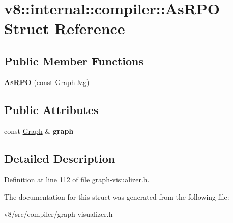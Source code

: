 \hypertarget{structv8_1_1internal_1_1compiler_1_1AsRPO}{}\section{v8\+:\+:internal\+:\+:compiler\+:\+:As\+R\+PO Struct Reference}
\label{structv8_1_1internal_1_1compiler_1_1AsRPO}
\subsection*{Public Member Functions}
\begin{DoxyCompactItemize}
\item 
\mbox{\label{structv8_1_1internal_1_1compiler_1_1AsRPO_a9211ea2f00b34d3ea8ca614de4963716}} 
{\bfseries As\+R\+PO} (const \mbox{\hyperlink{classv8_1_1internal_1_1compiler_1_1Graph}{Graph}} \&g)
\end{DoxyCompactItemize}
\subsection*{Public Attributes}
\begin{DoxyCompactItemize}
\item 
\mbox{\label{structv8_1_1internal_1_1compiler_1_1AsRPO_a3c00c6d27814245ad8fa87c0a7309cd4}} 
const \mbox{\hyperlink{classv8_1_1internal_1_1compiler_1_1Graph}{Graph}} \& {\bfseries graph}
\end{DoxyCompactItemize}


\subsection{Detailed Description}


Definition at line 112 of file graph-\/visualizer.\+h.



The documentation for this struct was generated from the following file\+:\begin{DoxyCompactItemize}
\item 
v8/src/compiler/graph-\/visualizer.\+h\end{DoxyCompactItemize}
